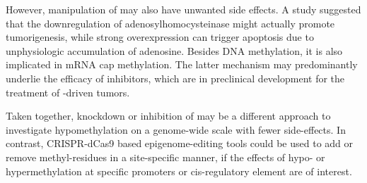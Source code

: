However, manipulation of  may also have unwanted side effects.  A study suggested that the downregulation of adenosylhomocysteinase might actually promote tumorigenesis\cite{Leal2008}, while strong overexpression can trigger apoptosis due to unphysiologic accumulation of adenosine\cite{Hermes2008}. Besides DNA methylation, it is also implicated in mRNA cap methylation\cite{Fernandez-Sanchez2009}. The latter mechanism may predominantly underlie the efficacy of  inhibitors, which are in preclinical development for the treatment of -driven tumors\cite{Uchiyama2017}.

Taken together,  knockdown or inhibition of  may be a different approach to investigate hypomethylation on a genome-wide scale with fewer side-effects. In contrast,  CRISPR-dCas9 based epigenome-editing tools could be used to add or remove methyl-residues in a site-specific manner, if the effects of hypo- or hypermethylation at specific promoters or cis-regulatory element are of interest. 